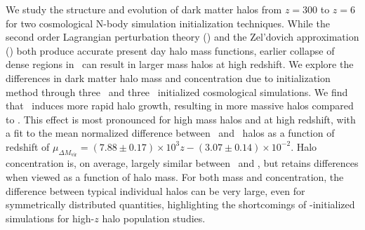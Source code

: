 
%
%
%
%


We study the structure and evolution of dark matter halos from $z = 300$ to $z = 6$ for two cosmological N-body simulation initialization techniques.  While the second order Lagrangian perturbation theory (\lpt) and the Zel'dovich approximation (\za) both produce accurate present day halo mass functions, earlier collapse of dense regions in \lpt\ can result in larger mass halos at high redshift.  We explore the differences in dark matter halo mass and concentration due to initialization method through three \lpt\ and three \za\ initialized cosmological simulations.  We find that \lpt\ induces more rapid halo growth, resulting in more massive halos compared to \za.  This effect is most pronounced for high mass halos and at high redshift, with a fit to the mean normalized difference between \lpt\ and \za\ halos as a function of redshift of $\mu_{\Delta M_{\mathrm{vir}}} = (7.88 \pm 0.17) \times 10^{3} z - (3.07 \pm 0.14) \times 10^{-2}$.  Halo concentration is, on average, largely similar between \lpt\ and \za, but retains differences when viewed as a function of halo mass.  For both mass and concentration, the difference between typical individual halos can be very large, even for symmetrically distributed quantities, highlighting the shortcomings of \za-initialized simulations for high-$z$ halo population studies.




